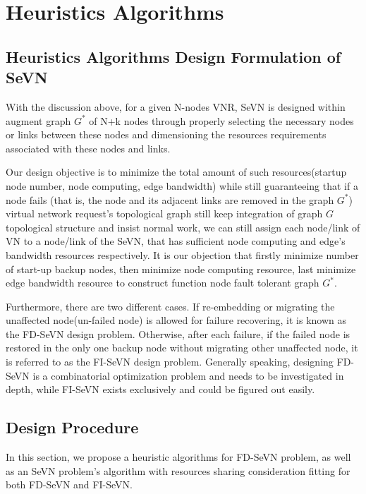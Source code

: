 \section{Heuristics Algorithms}
\subsection{Heuristics Algorithms Design Formulation of SeVN }
\label{sub:SeVNDesignFormulation}
With the discussion above, for a given N-nodes VNR, SeVN is designed within augment graph $G^*$ of N+k nodes through properly selecting the necessary nodes or links between these nodes and dimensioning the resources requirements associated with these nodes and links.

Our design objective is to minimize the total amount of such resources(startup node number, node computing, edge bandwidth) while still guaranteeing that if a node fails (that is, the node and its adjacent links are removed in the graph $G^*$) virtual network request's topological graph still keep integration of graph $G$ topological structure and insist normal work, we can still assign each node/link of VN to a node/link of the SeVN, that has sufficient node computing and edge's bandwidth resources respectively. It is our objection that firstly minimize number of start-up backup nodes, then minimize node computing resource, last minimize edge bandwidth resource to construct function node fault tolerant graph $G^*$.

Furthermore, there are two different cases. If re-embedding or migrating the unaffected node(un-failed node) is allowed for failure recovering, it is known as the FD-SeVN design problem. Otherwise, after each failure, if the failed node is restored in the only one backup node without migrating other unaffected node, it is referred to as the FI-SeVN design problem. Generally speaking, designing FD-SeVN is a combinatorial optimization problem and needs to be investigated in depth, while FI-SeVN exists exclusively and could be figured out easily.


\subsection{Design Procedure}

In this section, we propose a heuristic algorithms for FD-SeVN problem, as well as an SeVN problem's algorithm with resources sharing consideration fitting for both FD-SeVN and FI-SeVN.

